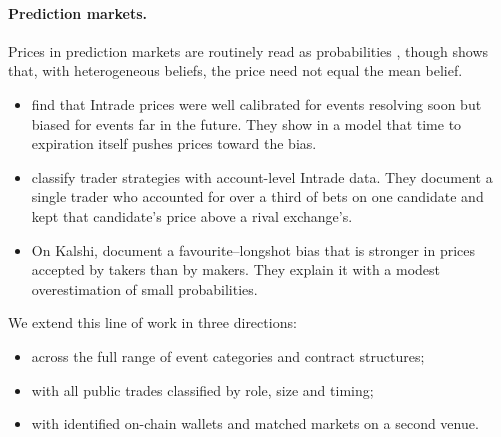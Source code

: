 \paragraph{Prediction markets.} Prices in prediction markets are routinely read as probabilities
\citep{wolferszitzewitz2004,wolferszitzewitz2006}, though \citet{manski2006} shows that, with
heterogeneous beliefs, the price need not equal the mean belief.
\begin{itemize}
  \item \citet{pageclemen2013} find that Intrade prices were well calibrated for events
  resolving soon but biased for events far in the future. They show in a model that time to
  expiration itself pushes prices toward the bias.
  \item \citet{rothschildsethi2016} classify trader strategies with account-level Intrade data.
  They document a single trader who accounted for over a third of bets on one candidate and kept
  that candidate's price above a rival exchange's.
  \item On Kalshi, \citet{burgi2025} document a favourite--longshot bias that is stronger in
  prices accepted by takers than by makers. They explain it with a modest overestimation of small
  probabilities.
\end{itemize}
We extend this line of work in three directions:
\begin{itemize}
  \item across the full range of event categories and contract structures;
  \item with all public trades classified by role, size and timing;
  \item with identified on-chain wallets and matched markets on a second venue.
\end{itemize}

